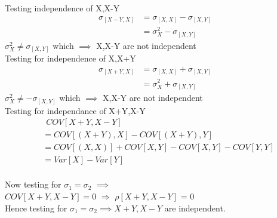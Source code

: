 \documentclass{article}
\begin{document}
Testing independence of X,X-Y\\
\begin{align*}
    \sigma_{[X-Y,X]} &= \sigma_{[X,X]} - \sigma_{[X,Y]}\\
                     &= \sigma_{X}^2 - \sigma_{[X,Y]}
\end{align*}
$\sigma_{X}^2 \neq \sigma_{[X,Y]}$ which $\implies$ X,X-Y are not independent\\

Testing for independence of X,X+Y\\
\begin{align*}
    \sigma_{[X+Y,X]} &= \sigma_{[X,X]} + \sigma_{[X,Y]}\\
                     &= \sigma_{X}^2 + \sigma_{[X,Y]}
\end{align*}
$\sigma_{X}^2 \neq -\sigma_{[X,Y]}$ which $\implies$ X,X-Y are not independent\\

Testing for independance of X+Y,X-Y
\begin{align*}
& \hspace{5pt}COV[X+Y, X-Y]\\
&= COV[(X+Y), X] - COV[(X+Y), Y] \\
&= COV[(X,X)] + COV[X,Y] - COV[X,Y] - COV[Y,Y] \\
&= Var[X] - Var[Y]\\
\end{align*}

Now testing for $\sigma_1 = \sigma_2 $ $\implies$ \\ $COV[X+Y,X-Y] = 0 $ $\Rightarrow$ $\rho[X+Y,X-Y]$ =  0\\
Hence testing for   $\sigma_1 = \sigma_2 \implies X+Y, X-Y$ are independent.
\end{document}

